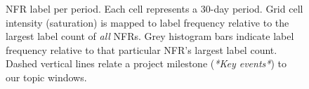 \documentclass[smallextended]{svjour3}       %
\begin{document}
\begin{figure}[t]
\centering
{}           
                                             
	\caption[]{NFR label per period. Each cell represents a 30-day period. %
	Grid cell intensity (saturation) is mapped to label frequency
        relative to the largest label count of \emph{all} NFRs. Grey
        histogram bars indicate label frequency relative to that
        particular NFR's largest label count. Dashed vertical lines
        relate a project milestone (\emph{*Key events*}) to our topic windows. 
}
\label{fig:timelines}
\end{figure}

\end{document}
